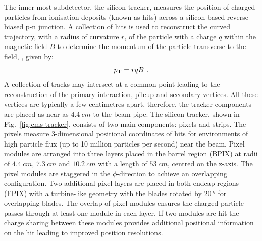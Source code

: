The inner most subdetector, the silicon tracker, measures the position of
charged particles from ionisation deposits (known as hits) across a
silicon-based reverse-biased p-n junction. A collection of hits is used to
reconstruct the curved trajectory, with a radius of curvature $r$, of the
particle with a charge $q$ within the magnetic field $B$ to determine the
momentum of the particle transverse to the field, \pt, given by:
%
\begin{equation}
    p_{\text{T}} = rqB\ .
\end{equation}
%
A collection of tracks may intersect at a common point leading to the
reconstruction of the primary interaction, pileup and secondary vertices.
All these vertices are typically a few centimetres apart, therefore, the tracker
components are placed as near as ${\SI{4.4}{cm}}$ to the beam pipe.  The
silicon tracker, shown in Fig.~\ref{fig:cms-tracker}, consists of two main
components: pixels and strips. The pixels measure 3-dimensional positional
coordinates of hits for environments of high particle flux (up to 10 million
particles per second) near the beam. Pixel modules are arranged into three
layers placed in the barrel region (BPIX) at radii of ${\SI{4.4}{cm}}$,
${\SI{7.3}{cm}}$ and ${\SI{10.2}{cm}}$ with a length of ${\SI{53}{cm}}$,
centred on the z-axis. The pixel modules are staggered in the $\phi$-direction
to achieve an overlapping configuration. Two additional pixel layers are
placed in both endcap regions (FPIX) with a turbine-like geometry with the
blades rotated by ${\SI{20}{\degree}}$ for overlapping blades. The overlap of
pixel modules ensures the charged particle passes through at least one module
in each layer. If two modules are hit the charge sharing between these modules
provides additional positional information on the hit leading to improved
position resolutions.

